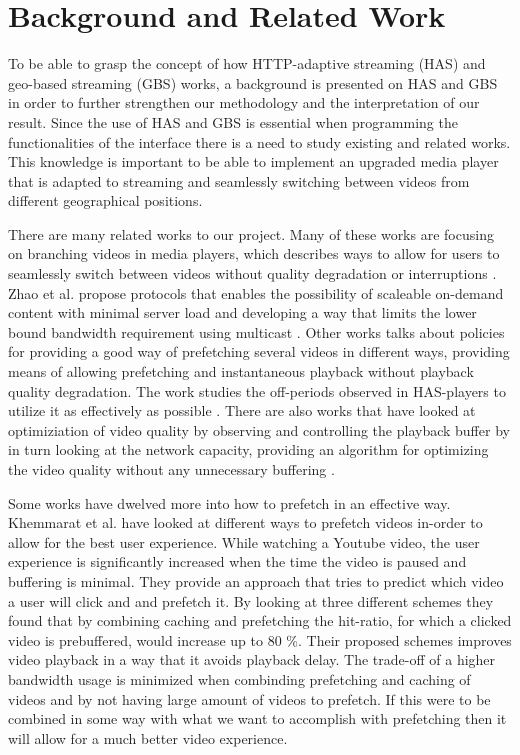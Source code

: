 \chapter{Background and Related Work}
\label{cha:theory}

To be able to grasp the concept of how HTTP-adaptive streaming (HAS) and geo-based streaming (GBS) works, a background is presented on HAS and GBS in order to further strengthen our methodology and the interpretation of our result. Since the use of HAS and GBS is essential when programming the functionalities of the interface there is a need to study existing and related works. This knowledge is important to be able to implement an upgraded media player that is adapted to streaming and seamlessly switching between videos from different geographical positions.

There are many related works to our project. Many of these works are focusing on branching videos in media players, which describes ways to allow for users to seamlessly switch between videos without quality degradation or interruptions \cite{qualbranch, hasmultipath,scalableOnDemand}. Zhao et al. \cite{scalableOnDemand} propose protocols that enables the possibility of scaleable on-demand content with minimal server load and developing a way that limits the lower bound bandwidth requirement using multicast \cite{scalableOnDemand}. Other works talks about policies for providing a good way of prefetching several videos in different ways, providing means of allowing prefetching and instantaneous playback without playback quality degradation. The work studies the off-periods observed in HAS-players to utilize it as effectively as possible \cite{bandawarePrefetch}. There are also works that have looked at optimiziation of video quality by observing and controlling the playback buffer by in turn looking at the network capacity, providing an algorithm for optimizing the video quality without any unnecessary buffering \cite{bufferbased}.

Some works have dwelved more into how to prefetch in an effective way. Khemmarat et al. \cite{watchingprefetching} have looked at different ways to prefetch videos in-order to allow for the best user experience. While watching a Youtube video, the user experience is significantly increased when the time the video is paused and buffering is minimal. They provide an approach that tries to predict which video a user will click and and prefetch it. By looking at three different schemes they found that by combining caching and prefetching the hit-ratio, for which a clicked video is prebuffered, would increase up to 80 \%. Their proposed schemes improves video playback in a way that it avoids playback delay. The trade-off of a higher bandwidth usage is minimized when combinding prefetching and caching of videos and by not having large amount of videos to prefetch. If this were to be combined in some way with what we want to accomplish with prefetching then it will allow for a much better video experience.

